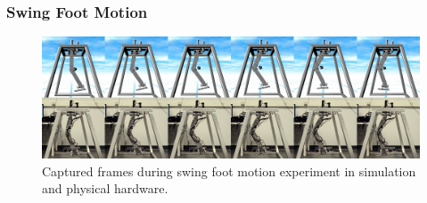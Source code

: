 \subsubsection{Swing Foot Motion} %
\label{ssub:swing_foot_motion}

\begin{figure}[!h]
	\centering
    \includegraphics[scale=0.145]{fig/experiments/swingmotionframes.png} 
  	\caption{Captured frames during swing foot motion experiment in simulation and physical hardware.}
	\label{fig:swingmotionframes}
\end{figure}

